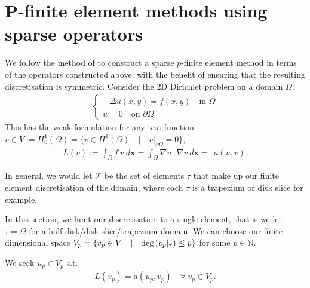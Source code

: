 \documentclass[11pt, oneside]{article}   	%
\newcommand{\N}{\mathbb{N}}
\newcommand{\element}{\tau}
\newcommand{\FEset}{\mathcal{T}}
\begin{document}
%
\appendix
%
\section{P-finite element methods using sparse operators}\label{Appendix:PFEM}

We follow the method of \cite{beuchler2006new} to construct a sparse $p$-finite element method in terms of the operators constructed above, with the benefit of ensuring that the resulting discretisation is symmetric. Consider the 2D Dirichlet problem on a domain $\Omega$:
\begin{align*}
	\begin{cases}
         - \Delta u(x,y) = f(x,y) \quad \text{in } \Omega \\
         u = 0 \quad \text{on } \partial \Omega
         \end{cases}
\end{align*}
This has the weak formulation for any test function $v \in V := H_0^1(\Omega) = \{v \in H^1(\Omega) \quad | \quad v|_{\partial \Omega} = 0 \}$,
\begin{align*}
	L(v) := \int_\Omega f \: v \: d\mathbf{x} = \int_\Omega \nabla u \cdot \nabla v \: d\mathbf{x} =: a(u,v).
\end{align*}

In general, we would let $\FEset$ be the set of elements $\element$ that make up our finite element discretisation of the domain, where each $\element$ is a trapezium or disk slice for example. 


In this section, we limit our discretisation to a single element, that is we let $\element = \Omega$ for a half-disk/disk slice/trapezium domain. We can choose our finite dimensional space $V_p = \{v_p \in V \quad | \quad {\rm deg}\,(v_p|_\element) \le p\}$ for some $p \in \N$.

We seek $u_p \in V_p$ s.t.
\begin{align}
	L(v_p) = a(u_p,v_p) \quad \forall \: v_p \in V_p.
	\label{eqn:FEMweakform}
\end{align}
\end{document}
